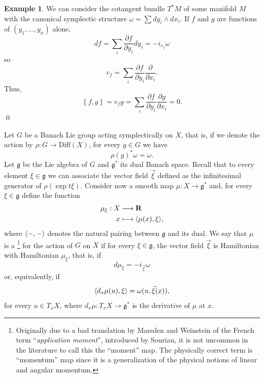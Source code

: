 \documentclass[12pt,a4paper]{book}
\theoremstyle{definition} \newtheorem{defn}[thm]{Definition}
\theoremstyle{definition} \newtheorem{ejemplo}[thm]{Example}
\theoremstyle{remark} \newtheorem{rem}[thm]{Remark}
\def\gg{\mathfrak{g}}
\def\RR{\mathbf{R}}
\let\emph\relax
\DeclarePairedDelimiter\esc{\langle}{\rangle}
\begin{document}
\begin{ejemplo}
  We can consider the cotangent bundle $T^*M$ of some manifold $M$ with the canonical symplectic structure $\omega=\sum dy_i \wedge dx_i$. If $f$ and $g$ are functions of $(y_1,\dots,y_n)$ alone,
  \begin{equation*}
    df=\sum_i \frac{\partial f}{\partial y_i} dy_i =- i_{v_f}\omega
  \end{equation*}
  so
  \begin{equation*}
    v_f=\sum_i \frac{\partial f}{\partial y_i}\frac{\partial}{\partial x_i}.
  \end{equation*}
  Thus, 
  \begin{equation*}
    \left\{ f,g \right\}=v_f g=\sum_{i} \frac{\partial f}{\partial y_i}\frac{\partial g}{\partial x_i}=0.
  \end{equation*}
  \qed
\end{ejemplo}

Let $G$ be a Banach Lie group acting symplectically on $X$, that is, if we denote the action by $\rho:G\rightarrow \mathrm{Diff}(X)$, for every $g\in G$ we have
\begin{equation*}
  \rho(g)^*\omega=\omega.
\end{equation*}
Let $\gg$ be the Lie algebra of $G$ and $\gg^*$ its dual Banach space. Recall that to every element $\xi \in \gg$ we can associate the vector field $\vec{\xi}$ defined as the infinitesimal generator of $\rho(\exp{t\xi})$. Consider now a smooth map $\mu:X\rightarrow \gg^*$ and, for every $\xi \in \gg$ define the function
\begin{align*}
  \mu_\xi :X&\longrightarrow \RR\\ 
  x &\longmapsto \esc{\mu(x),\xi}, 
  \end{align*}
  where $\esc{-,-}$ denotes the natural pairing between $\gg$ and its dual. We say that $\mu$ is a \emph{momentum map}\footnote{Originally due to a bad translation by Marsden and Weinstein of the French term ``\textit{application moment}'', introduced by Souriau, it is not uncommon in the literature to call this the ``moment'' map. The physically correct term is ``momentum'' map since it is a generalization of the physical notions of linear and angular momentum.} for the action of $G$ on $X$ if for every $\xi\in \gg$, the vector field $\vec{\xi}$ is Hamiltonian with Hamiltonian $\mu_\xi$, that is, if
  \begin{equation*}
    d\mu_\xi=-i_{\vec{\xi}}\omega
  \end{equation*}
  or, equivalently, if
  \begin{equation*}
    \esc{d_x\mu(u),\xi}=\omega(u,\vec{\xi}(x)),
  \end{equation*}
  for every $u\in T_xX$, where $d_x\mu:T_xX \rightarrow \gg^*$ is the derivative of $\mu$ at $x$.
\end{document}
